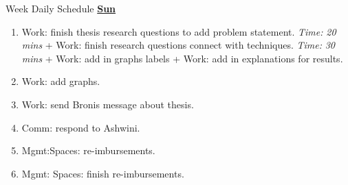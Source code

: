\documentclass[serif, mathserif, final]{beamer}
\newcommand{\timeEst}[1]{\textit{Time:} \textit{#1}}
\begin{document}
\begin{frame}{}
\begin{columns}
\begin{column}{0.50\linewidth}
\begin{block}{Week Daily Schedule}
\textbf{\small \underline{Sun}}
\begin{enumerate} 
\tiny \item \tiny Work: finish thesis research questions to add 
problem statement. \timeEst{20 mins} + Work: finish research questions connect with 
techniques.  \timeEst{30 mins}  +  Work: add in graphs labels + Work: add in explanations 
for results. 

\item \tiny Work: add graphs.
\item \tiny Work: send Bronis message about thesis. 
\item \tiny Comm: respond to Ashwini. 
\item \tiny Mgmt:Spaces: re-imbursements. 
\item \tiny Mgmt: Spaces: finish re-imbursements. 

\end{enumerate} 

\end{block} 
\end{column}%


\end{columns}
\end{frame}
\end{document}
